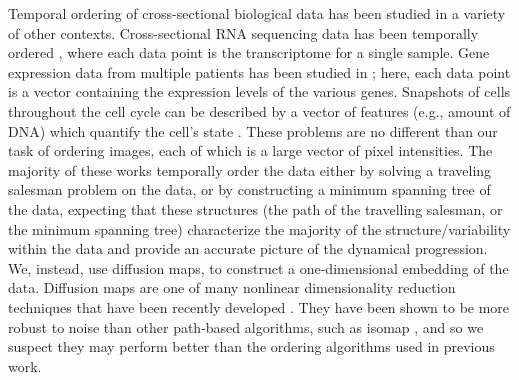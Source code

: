 \documentclass{pnastwo}
\begin{document}
\begin{article}
Temporal ordering of cross-sectional biological data has been studied in a variety of other contexts.
%
Cross-sectional RNA sequencing data has been temporally ordered \cite{anavy2014blind, trapnell2014dynamics}, where each data point is the transcriptome for a single sample.
%
Gene expression data from multiple patients has been studied in \cite{gupta2008extracting, qiu2011discovering};
here, each data point is a vector containing the expression levels of the various genes.
%
Snapshots of cells throughout the cell cycle can be described by a vector of features (e.g., amount of DNA) which quantify the cell's state  \cite{kafri2013dynamics}.
%
These problems are no different than our task of ordering images, each of which is a large vector of pixel intensities.
%
The majority of these works temporally order the data either by solving a traveling salesman problem on the data, or by constructing a minimum spanning tree of the data,
expecting that these structures (the path of the travelling salesman, or the minimum spanning tree) characterize the majority of the structure/variability within the data and provide an accurate picture of the dynamical progression.
%
We, instead, use diffusion maps, to construct a one-dimensional embedding of the data.
%
Diffusion maps are one of many nonlinear dimensionality reduction techniques that have been recently developed \cite{Belkin2003, tenenbaum2000global, Donoho2003, Roweis2000}.
%
They have been shown to be more robust to noise than other path-based algorithms, such as isomap \cite{balasubramanian2002isomap}, and so we suspect they may perform better than the ordering algorithms used in previous work.
%
%


\end{article}
\end{document}
